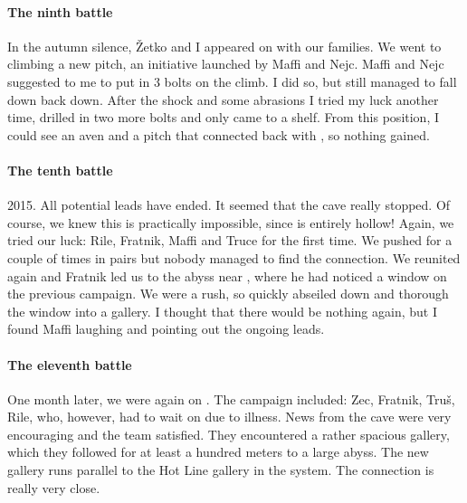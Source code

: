 \paragraph{The ninth battle} In the autumn silence, Žetko and I appeared on  with our families. We went to  climbing a new pitch, an initiative launched by Maffi and Nejc. Maffi and Nejc suggested to me to put in 3 bolts on the climb. I did so, but still managed to fall down back down.  After the shock and some abrasions I tried my luck another time, drilled in two more bolts and only came to a shelf. From this position, I could see an aven and a pitch that connected back with , so nothing gained.

\paragraph {The tenth battle} 2015. All potential leads have ended. It seemed that the cave really stopped. Of course, we knew this is practically impossible, since  is entirely hollow! Again, we tried our luck: Rile, Fratnik, Maffi and Truce for the first time. We pushed for a couple of times in pairs but nobody managed to find the connection. We reunited again and Fratnik led us to the abyss near , where he had noticed a window on the previous campaign. We were a rush, so quickly abseiled down and thorough the window into a gallery. I thought that there would be nothing again, but I found Maffi laughing and pointing out the ongoing leads.

\paragraph {The eleventh battle} One month later, we were again on . The campaign included: Zec, Fratnik, Truš, Rile, who, however, had to wait on  due to illness. News from the cave were very encouraging and the team satisfied. They encountered a rather spacious gallery, which they followed for at least a hundred meters to a large abyss. The new gallery runs parallel to the Hot Line gallery in the system. The connection is really very close.

